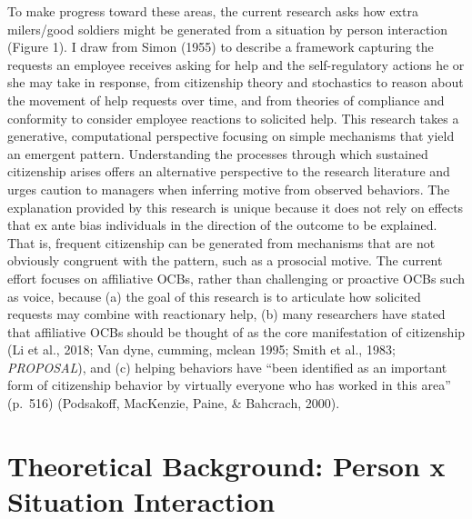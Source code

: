\documentclass[english,,man]{apa6}
\begin{document}
To make progress toward these areas, the current research asks how extra milers/good soldiers might be generated from a situation by person interaction (Figure 1). I draw from Simon (1955) to describe a framework capturing the requests an employee receives asking for help and the self-regulatory actions he or she may take in response, from citizenship theory and stochastics to reason about the movement of help requests over time, and from theories of compliance and conformity to consider employee reactions to solicited help. This research takes a generative, computational perspective focusing on simple mechanisms that yield an emergent pattern. Understanding the processes through which sustained citizenship arises offers an alternative perspective to the research literature and urges caution to managers when inferring motive from observed behaviors. The explanation provided by this research is unique because it does not rely on effects that ex ante bias individuals in the direction of the outcome to be explained. That is, frequent citizenship can be generated from mechanisms that are not obviously congruent with the pattern, such as a prosocial motive. The current effort focuses on affiliative OCBs, rather than challenging or proactive OCBs such as voice, because (a) the goal of this research is to articulate how solicited requests may combine with reactionary help, (b) many researchers have stated that affiliative OCBs should be thought of as the core manifestation of citizenship (Li et al., 2018; Van dyne, cumming, mclean 1995; Smith et al., 1983; \emph{PROPOSAL}), and (c) helping behaviors have \enquote{been identified as an important form of citizenship behavior by virtually everyone who has worked in this area} (p.~516) (Podsakoff, MacKenzie, Paine, \& Bahcrach, 2000).

\hypertarget{theoretical-background-person-x-situation-interaction}{%
\section{Theoretical Background: Person x Situation Interaction}\label{theoretical-background-person-x-situation-interaction}}
\end{document}
